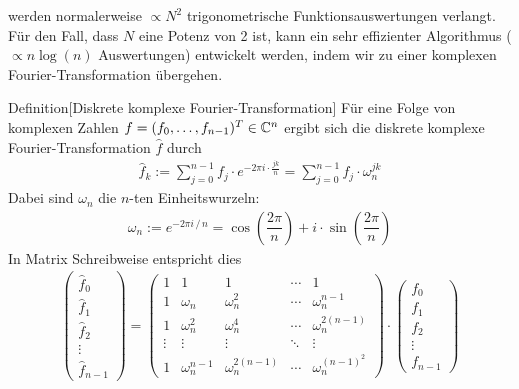 werden normalerweise $\propto N^2$ trigonometrische Funktionsauswertungen verlangt. Für den Fall, dass $N$ eine 
Potenz von 2 ist, kann ein sehr effizienter Algorithmus ($\propto n\log(n)$ Auswertungen) entwickelt werden, 
indem wir zu einer komplexen Fourier-Transformation übergehen.


\begin{colbox}{Definition}[Diskrete komplexe Fourier-Transformation]
  Für eine Folge von komplexen Zahlen $f=(f_0,\dots,f_{n-1})^T\in\mathbb C^n$ ergibt sich die diskrete 
  komplexe Fourier-Transformation $\hat{f}$ durch
  \begin{align*}
    \hat{f}_k := \sum_{j=0}^{n-1} f_j\cdot e^{-2\pi i\cdot\frac{jk}{n}} = \sum_{j=0}^{n-1} f_j\cdot \omega_n^{jk}
  \end{align*}
  Dabei sind $\omega_n$ die $n$-ten Einheitswurzeln:
  \begin{align*}
    \omega_n := e^{-2\pi i \,/\,n} = \cos\left(\dfrac{2\pi}{n}\right)+i\cdot\sin\left(\dfrac{2\pi}{n}\right)
  \end{align*}
  In Matrix Schreibweise entspricht dies 
  \begin{align*}
    \begin{pmatrix}
      \hat{f}_0 \\
      \hat{f}_1 \\
      \hat{f}_2 \\
      \vdots \\
      \hat{f}_{n-1}
    \end{pmatrix}
    =
    \begin{pmatrix}
      1 & 1 & 1 & \cdots & 1 \\
      1 & \omega_n & \omega_n^2 & \cdots & \omega_n^{n-1} \\
      1 & \omega_n^2 & \omega_n^4 & \cdots & \omega_n^{2(n-1)} \\
      \vdots & \vdots & \vdots & \ddots & \vdots \\
      1 & \omega_n^{n-1} & \omega_n^{2(n-1)} & \cdots & \omega_n^{(n-1)^2}
    \end{pmatrix}
    \cdot
    \begin{pmatrix}
      f_0 \\
      f_1 \\
      f_2 \\
      \vdots \\
      f_{n-1}
    \end{pmatrix}
  \end{align*}
\end{colbox}


